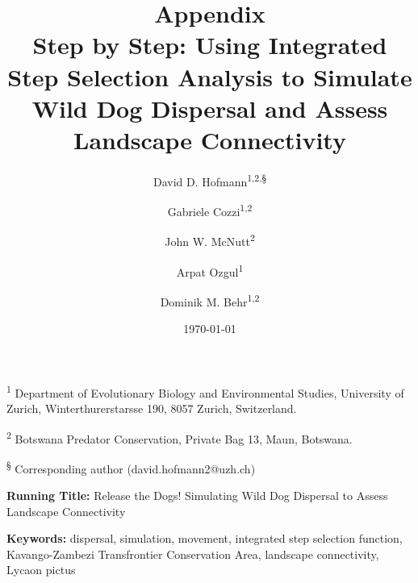 \documentclass[abstract=off,10pt,a4paper,bibliography=totocnumbered]{article}
\title{\textbf{Appendix}\\ Step by Step: Using Integrated Step Selection
Analysis to Simulate Wild Dog Dispersal and Assess Landscape Connectivity}
\author{
  David D. Hofmann\textsuperscript{1,2,\S} \and
  Gabriele Cozzi\textsuperscript{1,2} \and
  John W. McNutt\textsuperscript{2} \and
  Arpat Ozgul\textsuperscript{1} \and
  Dominik M. Behr\textsuperscript{1,2}
}
\date{\today}
\newcommand{\beginappendix}{%
  \setcounter{table}{0}
  \renewcommand{\thetable}{S\arabic{table}}%
  \setcounter{figure}{0}
  \renewcommand{\thefigure}{S\arabic{figure}}%
  \setcounter{equation}{0}
  \renewcommand{\theequation}{Equation S\arabic{equation}}%
  \setcounter{section}{0}
  \renewcommand{\thesection}{A.\arabic{section}}%
}
\begin{document}



\maketitle

\begin{flushleft}

 \vspace{0.5cm}

 \textsuperscript{1} Department of Evolutionary Biology and Environmental
 Studies, University of Zurich, Winterthurerstarsse 190, 8057 Zurich,
 Switzerland.

 \textsuperscript{2} Botswana Predator Conservation, Private Bag 13, Maun,
 Botswana.

 \textsuperscript{\S} Corresponding author (david.hofmann2@uzh.ch)

 \vspace{4cm}

 \textbf{Running Title:} Release the Dogs! Simulating Wild Dog Dispersal to
 Assess Landscape Connectivity

 \vspace{0.5cm}

 \textbf{Keywords:} dispersal, simulation, movement, integrated step selection
 function, Kavango-Zambezi Transfrontier Conservation Area, landscape
 connectivity, Lycaon pictus

\end{flushleft}

\newpage


\linenumbers

\appendix
\beginappendix

\newpage
\end{document}
